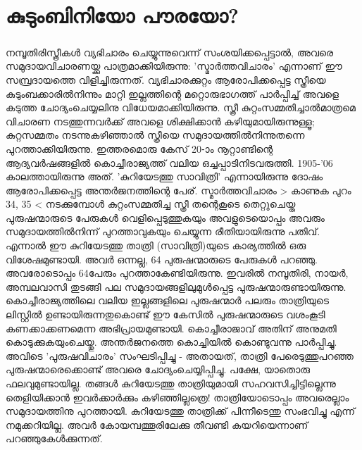 \chapter{കുടുംബിനിയോ പൗരയോ?}
\label{10}

\label{ch10box2} %
\begin{tcolorbox}[%
  breakable, %
  arc=0mm, 
  left=1pt, right = 1pt, 
  boxrule=0mm,
  colback = {blue!10}, %
] 

\paragraph{}നമ്പൂതിരിസ്ത്രീകൾ വ്യഭിചാരം ചെയ്യുന്നുവെന്ന് സംശയിക്കപ്പെട്ടാൽ, അവരെ സമുദായവിചാരണയ്ക്കു പാത്രമാക്കിയിരുന്നു: 'സ്മാർത്തവിചാരം' എന്നാണ് ഈ സമ്പ്രദായത്തെ വിളിച്ചിരുന്നത്. വ്യഭിചാരക്കുറ്റം ആരോപിക്കപ്പെട്ട സ്ത്രീയെ കുടുംബക്കാരിൽനിന്നും മാറ്റി ഇല്ലത്തിന്റെ മറ്റൊരുഭാഗത്ത് പാർപ്പിച്ച് അവളെ കടുത്ത ചോദ്യംചെയ്യലിനു വിധേയമാക്കിയിരുന്നു. സ്ത്രീ കുറ്റംസമ്മതിച്ചാൽമാത്രമെ വിചാരണ നടത്തുന്നവർക്ക് അവളെ ശിക്ഷിക്കാൻ കഴിയുമായിരുന്നുള്ളൂ; കുറ്റസമ്മതം നടന്നുകഴിഞ്ഞാൽ സ്ത്രീയെ സമുദായത്തിൽനിന്നുതന്നെ പുറത്താക്കിയിരുന്നു.
ഇത്തരമൊരു കേസ് 20-ാം നൂറ്റാണ്ടിന്റെ ആദ്യവർഷങ്ങളിൽ കൊച്ചീരാജ്യത്ത് വലിയ ഒച്ചപ്പാടിനിടവരുത്തി. 1905-'06 കാലത്തായിരുന്നു അത്. 'കുറിയേടത്തു സാവിത്രി' എന്നായിരുന്നു ദോഷം ആരോപിക്കപ്പെട്ട അന്തർജനത്തിന്റെ പേര്. സ്മാർത്തവിചാരം > കാണുക പുറം 34, 35 < നടക്കുമ്പോൾ കുറ്റംസമ്മതിച്ച സ്ത്രീ തന്റെകൂടെ തെറ്റുചെയ്ത പുരുഷന്മാരുടെ പേരുകൾ വെളിപ്പെടുത്തുകയും അവളുടെയൊപ്പം അവരും സമുദായത്തിൽനിന്ന് പുറത്താവുകയും ചെയ്യുന്ന രീതിയായിരുന്നു പതിവ്. എന്നാൽ ഈ കുറിയേടത്തു താത്രി (സാവിത്രി)യുടെ കാര്യത്തിൽ ഒരു വിശേഷമുണ്ടായി. അവർ ഒന്നല്ല, 64 പുരുഷന്മാരുടെ പേരുകൾ പറഞ്ഞു. അവരോടൊപ്പം 64പേരും പുറത്താകേണ്ടിയിരുന്നു. ഇവരിൽ നമ്പൂതിരി, നായർ, അമ്പലവാസി തുടങ്ങി പല സമുദായങ്ങളിലുമുൾപ്പെട്ട പുരുഷന്മാരുണ്ടായിരുന്നു. കൊച്ചീരാജ്യത്തിലെ വലിയ ഇല്ലങ്ങളിലെ പുരുഷന്മാർ പലരും താത്രിയുടെ ലിസ്റ്റിൽ ഉണ്ടായിരുന്നതുകൊണ്ട് ഈ കേസിൽ പുരുഷന്മാരുടെ വശംകൂടി കണക്കാക്കണമെന്ന അഭിപ്രായമുണ്ടായി. കൊച്ചീരാജാവ് അതിന് അനുമതി കൊടുക്കുകയുംചെയ്തു. അന്തർജനത്തെ കൊച്ചിയിൽ കൊണ്ടുവന്നു പാർപ്പിച്ചു. അവിടെ 'പുരുഷവിചാരം' സംഘടിപ്പിച്ചു - അതായത്, താത്രി പേരെടുത്തുപറഞ്ഞ പുരുഷന്മാരെക്കൊണ്ട് അവരെ ചോദ്യംചെയ്യിപ്പിച്ചു. പക്ഷേ, യാതൊരു ഫലവുമുണ്ടായില്ല. തങ്ങൾ കുറിയേടത്തു താത്രിയുമായി സഹവസിച്ചിട്ടില്ലെന്നു തെളിയിക്കാൻ ഇവർക്കാർക്കും കഴിഞ്ഞില്ലത്രെ! താത്രിയോടൊപ്പം അവരെല്ലാം സമുദായത്തിനു പുറത്തായി.
കുറിയേടത്തു താത്രിക്ക് പിന്നീടെന്തു സംഭവിച്ചു എന്ന് നമുക്കറിയില്ല. അവർ കോയമ്പത്തൂരിലേക്കു തീവണ്ടി കയറിയെന്നാണ് പറഞ്ഞുകേൾക്കുന്നത്.
\end{tcolorbox}
